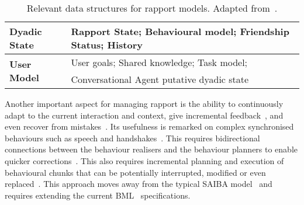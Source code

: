 \vspace{-3mm}
\begin{table}[]
    \centering
    \begin{tabular}{@{}ll@{}}
        \toprule
        
        \multirow{1}{*}{\textbf{Dyadic State}} & Rapport State; Behavioural model; Friendship Status; History \\ \midrule
        \multirow{2}{*}{\textbf{User Model}} & User goals; Shared knowledge; Task model; \\  
        & Conversational Agent putative dyadic state \\ \bottomrule        

    \end{tabular}
    \caption{Relevant data structures for rapport models. Adapted from~\cite{Zhao2014}.}
    \label{table:TCArchitectureDyadicRapportManagement:State}
\end{table}
\vspace{-7mm}

Another important aspect for managing rapport is the ability to continuously adapt to the current interaction and context, give incremental feedback~\cite{Kopp2007, Zwiers2011, Reidsma2011, Visser2014}, and even recover from mistakes~\cite{Kahn2008}. Its usefulness is remarked on complex synchronised behaviours such as speech and handshakes~\cite{Zwiers2011}. This requires bidirectional connections between the behaviour realisers and the behaviour planners to enable quicker corrections~\cite{Reidsma2011}. This also requires incremental planning and execution of behavioural chunks that can be potentially interrupted, modified or even replaced~\cite{Reidsma2011, Visser2014, Kopp2007, Zwiers2011}. This approach moves away from the typical SAIBA model~\cite{Kopp2006} and requires extending the current \ac{BML}~\cite{Kopp2007, Zwiers2011, Reidsma2011} specifications.